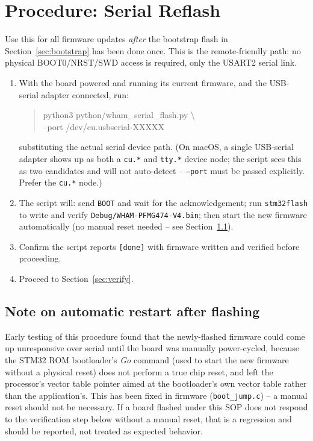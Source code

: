 \documentclass[11pt]{article}
\newcommand{\code}[1]{\texttt{#1}}
\begin{document}
\section{Procedure: Serial Reflash}
\label{sec:serial-flash}

Use this for all firmware updates \emph{after} the bootstrap flash in
Section~\ref{sec:bootstrap} has been done once. This is the
remote-friendly path: no physical BOOT0\slash NRST\slash SWD access is
required, only the USART2 serial link.

\begin{enumerate}[label=\arabic*.]
  \item With the board powered and running its current firmware, and the
    USB-serial adapter connected, run:
\begin{quote}\ttfamily\small\raggedright
python3 python/wham\_serial\_flash.py \textbackslash\\
\hspace*{1em}--port /dev/cu.usbserial-XXXXX
\end{quote}
    substituting the actual serial device path. (On macOS, a single
    USB-serial adapter shows up as both a \code{cu.*} and \code{tty.*}
    device node; the script sees this as two candidates and will not
    auto-detect -- \code{--port} must be passed explicitly. Prefer the
    \code{cu.*} node.)
  \item The script will: send \code{BOOT} and wait for the
    acknowledgement; run \code{stm32flash} to write and verify
    \code{Debug/WHAM-PFMG474-V4.bin}; then start the new firmware
    automatically (no manual reset needed -- see
    Section~\ref{sec:reset-note}).
  \item Confirm the script reports \texttt{[done]} with firmware
    written and verified before proceeding.
  \item Proceed to Section~\ref{sec:verify}.
\end{enumerate}

\subsection{Note on automatic restart after flashing}
\label{sec:reset-note}

Early testing of this procedure found that the newly-flashed firmware
could come up unresponsive over serial until the board was manually
power-cycled, because the STM32 ROM bootloader's \emph{Go} command (used
to start the new firmware without a physical reset) does not perform a
true chip reset, and left the processor's vector table pointer aimed at
the bootloader's own vector table rather than the application's. This
has been fixed in firmware (\code{boot\_jump.c}) -- a manual reset should
not be necessary. If a board flashed under this SOP does not respond to
the verification step below without a manual reset, that is a
regression and should be reported, not treated as expected behavior.
\end{document}

